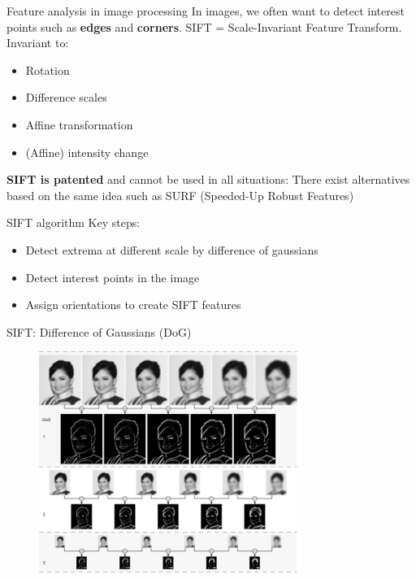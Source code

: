 \documentclass{beamer}
\newcommand{\1}[1]{\mathbbm{1}\left[#1\right]}
\begin{document}
\begin{frame}{Feature analysis in image processing}
In images, we often want to detect interest points such as \textbf{edges} and \textbf{corners}.
\vfill
\pause
SIFT = Scale-Invariant Feature Transform. Invariant to:
\begin{itemize}
	\item Rotation
	\item Difference scales
	\item Affine transformation
	\item (Affine) intensity change
\end{itemize}
\vfill
\pause
\textbf{SIFT is patented} and cannot be used in all situations: There exist alternatives based on the same idea such as SURF (Speeded-Up Robust Features)
\end{frame}

\begin{frame}{SIFT algorithm}
Key steps:
\begin{itemize}
	\item Detect extrema at different scale by difference of gaussians
	\item Detect interest points in the image
	\item Assign orientations to create SIFT features
\end{itemize}
\end{frame}

\begin{frame}{SIFT: Difference of Gaussians (DoG)}

\begin{figure}
\centering
\includegraphics[width=0.75\textwidth]{images/dog.png}
\end{figure}
\end{frame}
\end{document}
